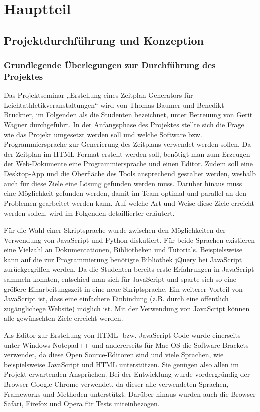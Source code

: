 
\chapter{Hauptteil}
\label{chap:Hauptteil}

\section{Projektdurchführung und Konzeption}
\subsection{Grundlegende Überlegungen zur Durchführung des Projektes}
Das Projektseminar „Erstellung eines Zeitplan-Generators für Leichtathletikveranstaltungen“ wird von Thomas Baumer und Benedikt Bruckner, im Folgenden als die Studenten bezeichnet, unter Betreuung von Gerit Wagner durchgeführt. In der Anfangsphase des Projektes stellte sich die Frage wie das Projekt umgesetzt werden soll und welche Software bzw. Programmiersprache zur Generierung des Zeitplans verwendet werden sollen.
Da der Zeitplan im HTML-Format erstellt werden soll, benötigt man zum Erzeugen der Web-Dokumente eine Programmiersprache und einen Editor. Zudem soll eine Desktop-App und die Oberfläche des Tools ansprechend gestaltet werden, weshalb auch für diese Ziele eine Lösung gefunden werden muss. Darüber hinaus muss eine Möglichkeit gefunden werden, damit im Team optimal und parallel an den Problemen gearbeitet werden kann. Auf welche Art und Weise diese Ziele erreicht werden sollen, wird im Folgenden detaillierter erläutert.

Für die Wahl einer Skriptsprache wurde zwischen den Möglichkeiten der Verwendung von JavaScript und Python diskutiert. Für beide Sprachen existieren eine Vielzahl an Dokumentationen, Bibliotheken und Tutorials. Beispielsweise kann auf die zur Programmierung benötigte Bibliothek jQuery bei JavaScript zurückgegriffen werden. Da die Studenten bereits erste Erfahrungen in JavaScript sammeln konnten, entschied man sich für JavaScript und sparte sich so eine größere Einarbeitungszeit in eine neue Skriptsprache. Ein weiterer Vorteil von JavaScript ist, dass eine einfachere Einbindung (z.B. durch eine öffentlich zugänglichege Website) möglich ist. Mit der Verwendung von JavaScript können alle gewünschten Ziele erreicht werden.

Als Editor zur Erstellung von HTML- bzw. JavaScript-Code wurde einerseits unter Windows Notepad++ und andererseits für Mac OS die Software Brackets verwendet, da diese Open Source-Editoren sind und viele Sprachen, wie beispielsweise JavaScript und HTML unterstützen. Sie genügen also allen im Projekt erwartenden Ansprüchen.
Bei der Entwicklung wurde vordergründig der Browser Google Chrome verwendet, da dieser alle verwendeten Sprachen, Frameworks und Methoden unterstützt. Darüber hinaus wurden auch die Browser Safari, Firefox und Opera für Tests miteinbezogen.

